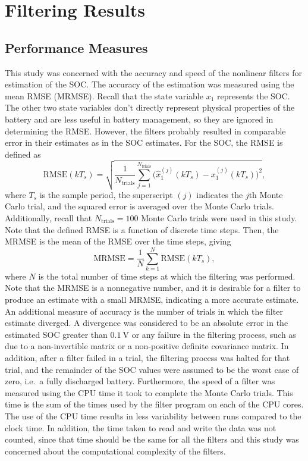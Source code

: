 \documentclass[../zhang_thesis.tex]{subfiles}
\begin{document}
\chapter{Filtering Results}


\section{Performance Measures}

This study was concerned with the accuracy and speed of the nonlinear filters for estimation of the SOC. The accuracy of the estimation was measured using the mean RMSE (MRMSE). Recall that the state variable $x_1$ represents the SOC. The other two state variables don't directly represent physical properties of the battery and are less useful in battery management, so they are ignored in determining the RMSE. However, the filters probably resulted in comparable error in their
estimates as in the SOC estimates. For the SOC, the RMSE is defined as
\begin{equation}
    \mathrm{RMSE}(kT_s) = \sqrt{ \frac{1}{N_\text{trials}} \sum_{j=1}^{N_\text{trials}} \Big( \hat{x}_1^{(j)}(kT_s) - x_1^{(j)}(kT_s) \Big)^2 },
\end{equation}
where $T_s$ is the sample period, the superscript $(j)$ indicates the $j$th Monte Carlo trial, and the squared error is averaged over the Monte Carlo trials. Additionally, recall that $N_\text{trials}=100$ Monte Carlo trials were used in this study. Note that the defined RMSE is a function of discrete time steps. Then, the MRMSE is the mean of the RMSE over the time steps, giving
\begin{equation}
    \mathrm{MRMSE} = \frac{1}{N} \sum_{k=1}^N \mathrm{RMSE}(kT_s),
\end{equation}
where $N$ is the total number of time steps at which the filtering was performed. Note that the MRMSE is a nonnegative number, and it is desirable for a filter to produce an estimate with a small MRMSE, indicating a more accurate estimate. An additional measure of accuracy is the number of trials in which the filter estimate diverged. A divergence was considered to be an absolute error in the estimated SOC greater than $0.1~\mathrm{V}$ or any failure in the filtering process, such
as due to a non-invertible matrix or a non-positive definite covariance matrix. In addition, after a filter failed in a trial, the filtering process was halted for that trial, and the remainder of the SOC values were assumed to be the worst case of zero, i.e.\ a fully discharged battery. Furthermore, the speed of a filter was measured using the CPU time it took to complete the Monte Carlo trials. This time is the sum of the times used by the filter program on each of the CPU cores. The use of
the CPU time results in less variability between runs compared to the clock time. In addition, the time taken to read and write the data was not counted, since that time should be the same for all the filters and this study was concerned about the computational complexity of the filters.
\end{document}
